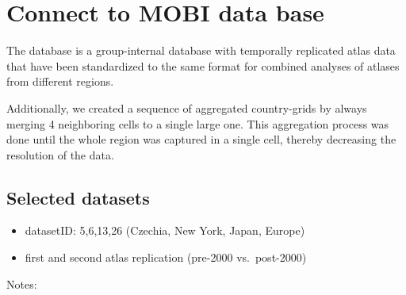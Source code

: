 \documentclass[
  letterpaper,
  DIV=11,
  numbers=noendperiod]{scrreprt}
\begin{document}
\hypertarget{connect-to-mobi-data-base}{%
\section{Connect to MOBI data base}\label{connect-to-mobi-data-base}}

The database is a group-internal database with temporally replicated
atlas data that have been standardized to the same format for combined
analyses of atlases from different regions.

Additionally, we created a sequence of aggregated country-grids by
always merging 4 neighboring cells to a single large one. This
aggregation process was done until the whole region was captured in a
single cell, thereby decreasing the resolution of the data.

\hypertarget{selected-datasets}{%
\subsection{Selected datasets}\label{selected-datasets}}

\begin{itemize}
\item
  datasetID: 5,6,13,26 (Czechia, New York, Japan, Europe)
\item
  first and second atlas replication (pre-2000 vs.~post-2000)
\end{itemize}

Notes:
\end{document}

